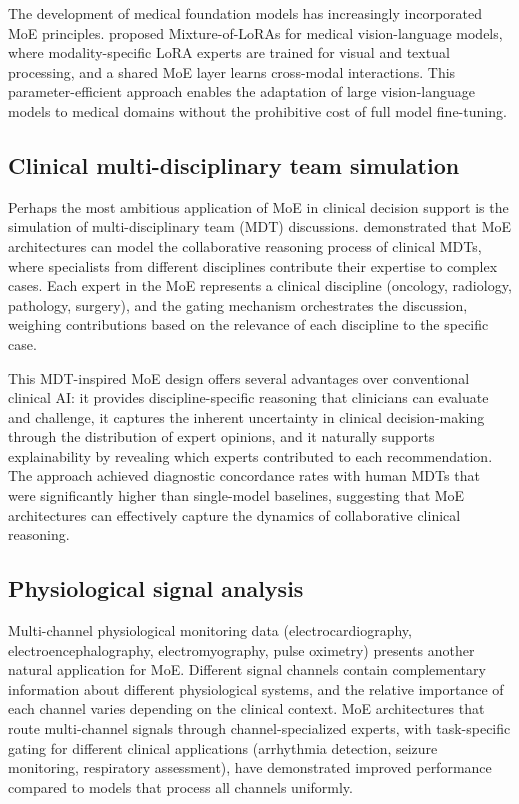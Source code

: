 The development of medical foundation models has increasingly incorporated MoE principles. \cite{phung2024moe_medical_llm} proposed Mixture-of-LoRAs for medical vision-language models, where modality-specific LoRA experts are trained for visual and textual processing, and a shared MoE layer learns cross-modal interactions. This parameter-efficient approach enables the adaptation of large vision-language models to medical domains without the prohibitive cost of full model fine-tuning.

\subsection*{Clinical multi-disciplinary team simulation}

Perhaps the most ambitious application of MoE in clinical decision support is the simulation of multi-disciplinary team (MDT) discussions. \cite{chen2026cor_mole} demonstrated that MoE architectures can model the collaborative reasoning process of clinical MDTs, where specialists from different disciplines contribute their expertise to complex cases. Each expert in the MoE represents a clinical discipline (oncology, radiology, pathology, surgery), and the gating mechanism orchestrates the discussion, weighing contributions based on the relevance of each discipline to the specific case.

This MDT-inspired MoE design offers several advantages over conventional clinical AI: it provides discipline-specific reasoning that clinicians can evaluate and challenge, it captures the inherent uncertainty in clinical decision-making through the distribution of expert opinions, and it naturally supports explainability by revealing which experts contributed to each recommendation. The approach achieved diagnostic concordance rates with human MDTs that were significantly higher than single-model baselines, suggesting that MoE architectures can effectively capture the dynamics of collaborative clinical reasoning.

\subsection*{Physiological signal analysis}

Multi-channel physiological monitoring data (electrocardiography, electroencephalography, electromyography, pulse oximetry) presents another natural application for MoE. Different signal channels contain complementary information about different physiological systems, and the relative importance of each channel varies depending on the clinical context. MoE architectures that route multi-channel signals through channel-specialized experts, with task-specific gating for different clinical applications (arrhythmia detection, seizure monitoring, respiratory assessment), have demonstrated improved performance compared to models that process all channels uniformly.

